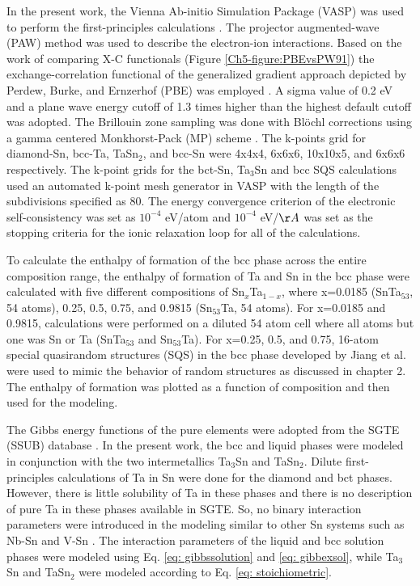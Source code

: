 In the present work, the Vienna Ab-initio Simulation Package (VASP) was used to perform the first-principles calculations \cite{Kresse1996}. The projector augmented-wave (PAW) \cite{Kresse1999,Blochl1994} method was used to describe the electron-ion interactions. Based on the work of comparing X-C functionals (Figure \ref{Ch5-figure:PBEvsPW91}) the exchange-correlation functional of the generalized gradient approach depicted by Perdew, Burke, and Ernzerhof (PBE) was employed \cite{Perdew1996a}. A sigma value of 0.2 eV and a plane wave energy cutoff of 1.3 times higher than the highest default cutoff was adopted. The Brillouin zone sampling was done with Bl\"ochl corrections \cite{Blochl1994} using a gamma centered Monkhorst-Pack (MP) scheme \cite{Monkhorst1976a}. The k-points grid for diamond-Sn, bcc-Ta, TaSn$_2$, and bcc-Sn were 4x4x4, 6x6x6, 10x10x5, and 6x6x6 respectively. The k-point grids for the bct-Sn, Ta$_3$Sn and bcc SQS calculations used an automated k-point mesh generator in VASP with the length of the subdivisions specified as 80. The energy convergence criterion of the electronic self-consistency was set as $10^{-4}$ eV/atom and $10^{-4}$ eV/$\AA$ was set as the stopping criteria for the ionic relaxation loop for all of the calculations. 

To calculate the enthalpy of formation of the bcc phase across the entire composition range, the enthalpy of formation of Ta and Sn in the bcc phase were calculated with five different compositions of Sn$_{x}$Ta$_{1-x}$, where x=0.0185 (SnTa$_{53}$, 54 atoms), 0.25, 0.5, 0.75, and 0.9815 (Sn$_{53}$Ta, 54 atoms). For x=0.0185 and 0.9815, calculations were performed on a diluted 54 atom cell where all atoms but one was Sn or Ta (SnTa$_{53}$ and Sn$_{53}$Ta). For x=0.25, 0.5, and 0.75, 16-atom special quasirandom structures (SQS) in the bcc phase developed by Jiang et al. \cite{Jiang2004} were used to mimic the behavior of random structures as discussed in chapter 2. The enthalpy of formation was plotted as a function of composition and then used for the modeling.  

The Gibbs energy functions of the pure elements were adopted from the SGTE (SSUB) database \cite{Dinsdale1991}. In the present work, the bcc and liquid phases were modeled in conjunction with the two intermetallics Ta$_3$Sn and TaSn$_2$. Dilute first-principles calculations of Ta in Sn were done for the diamond and bct phases. However, there is little solubility of Ta in these phases and there is no description of pure Ta in these phases available in SGTE. So, no binary interaction parameters were introduced in the modeling similar to other Sn systems such as Nb-Sn and V-Sn \cite{Yue2009,Toffolon2002}. The interaction parameters of the liquid and bcc solution phases were modeled using Eq. \ref{eq: gibbssolution} and \ref{eq: gibbexsol}, while Ta$_3$Sn and TaSn$_2$ were modeled according to Eq. \ref{eq: stoichiometric}.

